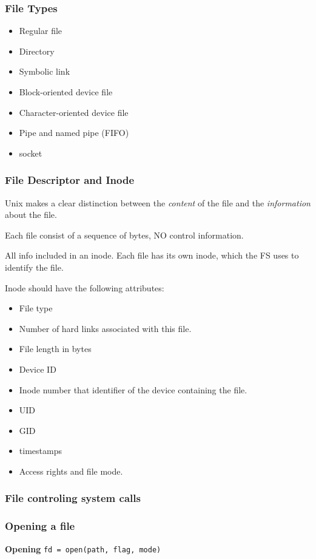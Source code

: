 \documentclass[a4paper,10pt]{book}
\begin{document}
\subsubsection{File Types}
\begin{itemize}
\item Regular file
\item Directory
\item Symbolic link
\item Block-oriented device file
\item Character-oriented device file
\item Pipe and named pipe (FIFO)
\item socket
\end{itemize}
\subsubsection{File Descriptor and Inode}
Unix makes a clear distinction between the \emph{content} of the file and the
\emph{information} about the file.

Each file consist of a sequence of bytes, NO control information.

All info included in an inode. Each file has its own inode, which the FS uses to
identify the file.

Inode should have the following attributes:
\begin{itemize}
\item File type
\item Number of hard links associated with this file.
\item File length in bytes
\item Device ID
\item Inode number that identifier of the device containing the file.
\item UID
\item GID
\item timestamps
\item Access rights and file mode.
\end{itemize}
\subsubsection{File controling system calls}
\subsubsection{Opening a file}
\textbf{Opening} \verb|fd = open(path, flag, mode)|
\end{document}
